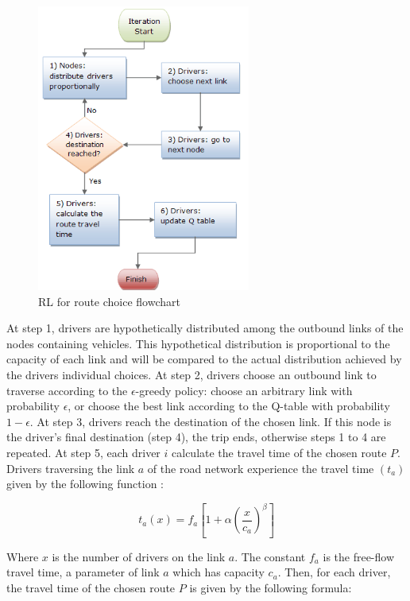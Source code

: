 \documentclass[12pt]{article}
\begin{document}
\begin{figure}[ht]
    \centerline{\includegraphics[width=7cm]{img/flowchart.png}}
    \caption{RL for route choice flowchart}
    \label{fig:flowchart}
\end{figure}

At step 1, drivers are hypothetically distributed among the outbound links of the nodes containing vehicles. This hypothetical distribution is proportional to the capacity of each link and will be compared to the actual distribution achieved by the drivers individual choices. At step 2, drivers choose an outbound link to traverse according to the $\epsilon$-greedy policy: choose an arbitrary link with probability $\epsilon$, or choose the best link according to the Q-table with probability $1-\epsilon$. At step 3, drivers reach the destination of the chosen link. If this node is the driver's final destination (step 4), the trip ends, otherwise steps 1 to 4 are repeated. At step 5, each driver $i$ calculate the travel time of the chosen route $P$. Drivers traversing the link $a$ of the road network experience the travel time $(t_a)$ given by the following function \cite{Ortuzar&Willumsen2001}:

\begin{equation}
\label{eq:tt}
t_a(x) = f_a[1 + \alpha \left(\frac{x}{c_a}\right)^\beta]
\end{equation}

Where $x$ is the number of drivers on the link $a$. The constant $f_a$ is the free-flow travel time, a parameter of link $a$ which has capacity $c_a$. Then, for each driver, the travel time of the chosen route $P$ is given by the following formula:
\end{document}
